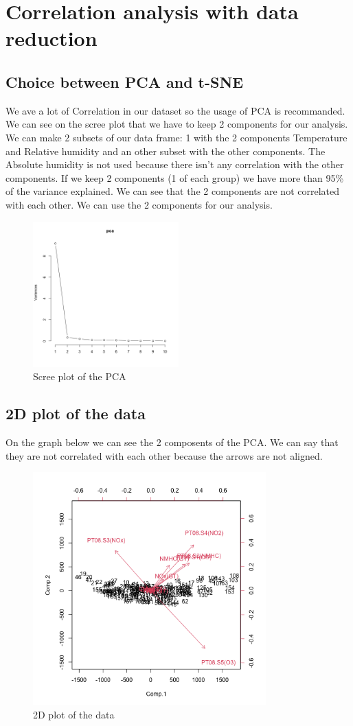 \section{Correlation analysis with data reduction}

\subsection{Choice between PCA and t-SNE}
We ave a lot of Correlation in our dataset so the usage of PCA is recommanded. We can see on the scree plot that we have to keep 2 components for our analysis.
We can make 2 subsets of our data frame: 1 with the 2 components Temperature and Relative humidity and an other subset with the other components. The Absolute humidity is not used because there isn't any correlation with the other components.
If we keep 2 components (1 of each group) we have more than 95\% of the variance explained. We can see that the 2 components are not correlated with each other. We can use the 2 components for our analysis.
\begin{figure}[h]
\centering
\includegraphics[width=0.5\textwidth]{figs/pca.png}
\caption{Scree plot of the PCA}
\label{fig:scree_plot}
\end{figure}

\subsection{2D plot of the data}

On the graph below we can see the 2 composents of the PCA. We can say that they are not correlated with each other because the arrows are not aligned.
\begin{figure}[H]
\centering
\includegraphics[width=0.8\textwidth]{figs/biplot.png}
\caption{2D plot of the data}
\label{fig:2d_plot}
\end{figure}
